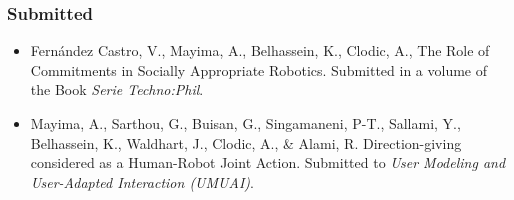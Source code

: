 \documentclass[a4paper,11pt,twoside]{StyleThese}
\begin{document}
%

\subsubsection*{Submitted}
\begin{itemize}
\item Fernández Castro, V., Mayima, A., Belhassein, K., Clodic, A., The Role of Commitments in Socially Appropriate Robotics. Submitted in a volume of the Book \textit{Serie Techno:Phil}.

\item Mayima, A., Sarthou, G., Buisan, G., Singamaneni, P-T., Sallami, Y., Belhassein, K., Waldhart, J., Clodic, A., \& Alami, R. Direction-giving considered as a Human-Robot Joint
Action. Submitted to \textit{User Modeling and User-Adapted Interaction (UMUAI)}.


\end{itemize}	







 

\ifdefined{}
\else


\end{document}
